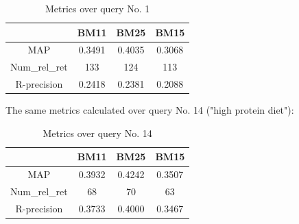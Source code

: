 \documentclass[letterpaper,11pt]{article}
\begin{document}
\begin{center}
\begin{table}[ht]
\centering
\begin{tabular}{c | c c c}
   & BM11  & BM25 & BM15  \\  \hline
MAP & 0.3491 & 0.4035 & 0.3068 \\
Num\_rel\_ret & 133 & 124 & 113 \\
R-precision & 0.2418 & 0.2381 & 0.2088
\end{tabular}
\caption{Metrics over query No. 1}  
\end{table}
\end{center}

\newpage

The same metrics calculated over query No. 14 ("high protein diet"):


\begin{center}
\begin{table}[ht]
\centering
\begin{tabular}{c | c c c}
   & BM11  & BM25 & BM15  \\  \hline
MAP & 0.3932 & 0.4242 & 0.3507 \\
Num\_rel\_ret & 68 & 70 & 63 \\
R-precision & 0.3733 & 0.4000 & 0.3467
\end{tabular}
\caption{Metrics over query No. 14}  
\end{table}
\end{center}
\end{document}
